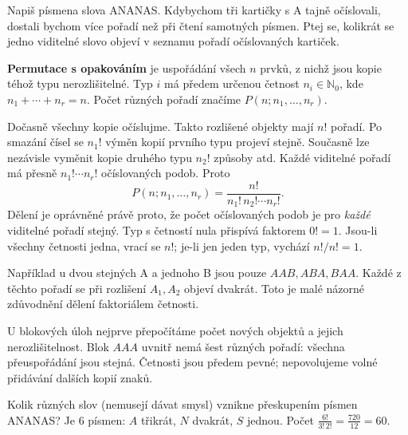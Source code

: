 \documentclass[11pt,a4paper]{article}
\begin{document}
Napiš písmena slova ANANAS. Kdybychom tři kartičky s A tajně očíslovali, dostali bychom více pořadí než při čtení samotných písmen. Ptej se, kolikrát se jedno viditelné slovo objeví v seznamu pořadí očíslovaných kartiček.

\begin{definiceBox}
\textbf{Permutace s opakováním} je uspořádání všech $n$ prvků, z nichž jsou kopie téhož typu nerozlišitelné. Typ $i$ má předem určenou četnost $n_i\in\mathbb N_0$, kde $n_1+\cdots+n_r=n$. Počet různých pořadí značíme $P(n;n_1,\ldots,n_r)$.
\end{definiceBox}

Dočasně všechny kopie očíslujme. Takto rozlišené objekty mají $n!$ pořadí. Po smazání čísel se $n_1!$ výměn kopií prvního typu projeví stejně. Současně lze nezávisle vyměnit kopie druhého typu $n_2!$ způsoby atd. Každé viditelné pořadí má přesně $n_1!\cdots n_r!$ očíslovaných podob. Proto
\[
 P(n;n_1,\ldots,n_r)=\frac{n!}{n_1!\,n_2!\cdots n_r!}.
\]
Dělení je oprávněné právě proto, že počet očíslovaných podob je pro \emph{každé} viditelné pořadí stejný. Typ s četností nula přispívá faktorem $0!=1$. Jsou-li všechny četnosti jedna, vrací se $n!$; je-li jen jeden typ, vychází $n!/n!=1$.

Například u dvou stejných A a jednoho B jsou pouze $AAB,ABA,BAA$. Každé z těchto pořadí se při rozlišení $A_1,A_2$ objeví dvakrát. Toto je malé názorné zdůvodnění dělení faktoriálem četnosti.

U blokových úloh nejprve přepočítáme počet nových objektů a jejich nerozlišitelnost. Blok $AAA$ uvnitř nemá šest různých pořadí: všechna přeuspořádání jsou stejná. Četnosti jsou předem pevné; nepovolujeme volné přidávání dalších kopií znaků.




\begin{prikladReseniBox}[title={Příklad P1}]
Kolik různých slov (nemusejí dávat smysl) vznikne přeskupením písmen \textsc{ANANAS}?
\tcblower
Je \(6\) písmen: \(A\) třikrát, \(N\) dvakrát, \(S\) jednou. Počet \(\frac{6!}{3!\,2!}=\frac{720}{12}=60\).
\end{prikladReseniBox}
\end{document}
